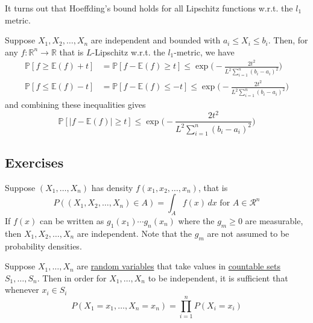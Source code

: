     It turns out that Hoeffding's bound holds for all Lipschitz functions w.r.t. the $l_1$ metric. 

    \begin{theorem}
      \label{thm:mcdiarmids-bounded-differences-inequality}
      Suppose $X_1, X_2, \ldots, X_n$ are independent and bounded with $a_i \leq X_i \leq b_i$. Then, for any $f: \mathbb{R}^n \to \mathbb{R}$ that is $L$-Lipschitz w.r.t. the $l_1$-metric, we have 
      \begin{align*}
        \mathbb{P} [ f \geq \mathbb{E}(f) + t] & = \mathbb{P} [ f - \mathbb{E}(f) \geq t] \leq \exp\bigg(- \frac{2 t^2}{L^2 \sum_{i=1}^n (b_i - a_i)^2} \bigg) \\
        \mathbb{P} [ f \leq \mathbb{E}(f) - t] & = \mathbb{P} [ f - \mathbb{E}(f) \leq -t] \leq \exp\bigg(- \frac{2 t^2}{L^2 \sum_{i=1}^n (b_i - a_i)^2} \bigg)
      \end{align*}
      and combining these inequalities gives 
      \begin{equation}
        \mathbb{P} [ |f - \mathbb{E}(f)| \geq t] \leq \exp\bigg(- \frac{2 t^2}{L^2 \sum_{i=1}^n (b_i - a_i)^2} \bigg)
      \end{equation}
    \end{theorem}

\subsection{Exercises} 

  \begin{exercise}[Durrett 2.1.1]
    Suppose $(X_1, \dots, X_n)$ has density $f(x_1, x_2, \dots, x_n)$, that is
    \begin{equation*}
      P((X_1, X_2, \dots, X_n) \in A) = \int_A f(x) \, dx \text{ for } A \in \mathcal{R}^n
    \end{equation*}
    If $f(x)$ can be written as $g_1(x_1) \cdots g_n(x_n)$ where the $g_m \geq 0$ are measurable, then $X_1, X_2, \dots, X_n$ are independent. Note that the $g_m$ are not assumed to be probability densities.
  \end{exercise}
  \begin{solution}

  \end{solution}

  \begin{exercise}[Durrett 2.1.2]
    Suppose $X_1, \dots, X_n$ are \hyperref[def:random-variable]{random variables} that take values in \hyperref[st-def:countable]{countable sets} $S_1, \dots, S_n$. Then in order for $X_1, \dots, X_n$ to be independent, it is sufficient that whenever $x_i \in S_i$
    \begin{equation*}
      P(X_1 = x_1, \dots, X_n = x_n) = \prod_{i=1}^n P(X_i = x_i)
    \end{equation*}
  \end{exercise}
  \begin{solution}

  \end{solution}

